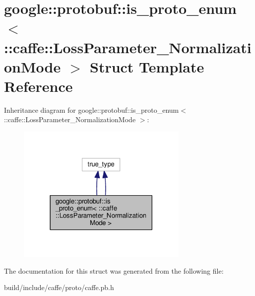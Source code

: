 \hypertarget{structgoogle_1_1protobuf_1_1is__proto__enum_3_01_1_1caffe_1_1_loss_parameter___normalization_mode_01_4}{}\section{google\+:\+:protobuf\+:\+:is\+\_\+proto\+\_\+enum$<$ \+:\+:caffe\+:\+:Loss\+Parameter\+\_\+\+Normalization\+Mode $>$ Struct Template Reference}
\label{structgoogle_1_1protobuf_1_1is__proto__enum_3_01_1_1caffe_1_1_loss_parameter___normalization_mode_01_4}


Inheritance diagram for google\+:\+:protobuf\+:\+:is\+\_\+proto\+\_\+enum$<$ \+:\+:caffe\+:\+:Loss\+Parameter\+\_\+\+Normalization\+Mode $>$\+:
\nopagebreak
\begin{figure}[H]
\begin{center}
\leavevmode
\includegraphics[width=234pt]{structgoogle_1_1protobuf_1_1is__proto__enum_3_01_1_1caffe_1_1_loss_parameter___normalization_mode_01_4__inherit__graph}
\end{center}
\end{figure}


The documentation for this struct was generated from the following file\+:\begin{DoxyCompactItemize}
\item 
build/include/caffe/proto/caffe.\+pb.\+h\end{DoxyCompactItemize}
